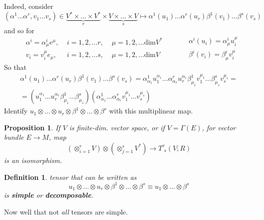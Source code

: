 \documentclass[10pt]{amsart}
\newtheorem{proposition}{Proposition}
\newtheorem{definition}{Definition}
\begin{document}
\begin{multicols*}{2}
Indeed, consider 
\[
(\alpha^1 \dots \alpha^r, v_1 \dots v_s) \in \underbrace{V^* \times \dots \times V^* }_{r} \times \underbrace{ V\times \dots \times V}_{s} \mapsto \alpha^1(u_1) \dots \alpha^r(u_r) \beta^1(v_1) \dots \beta^s(v_s)
\]
and so for 
\[
\begin{aligned}
	& \alpha^i = \alpha^i_{\mu} e^{\mu} , \, & \, i =1,2, \dots r, \, & \, \mu = 1,2, \dots \text{dim}V^* \\ 
	& v_i = v_i^{\mu} e_{\mu} , \, & \, i = 1,2, \dots s, \, & \, \mu = 1, 2, \dots \text{dim}V 
\end{aligned} \qquad \, \begin{aligned}
& \alpha^i(u_i) = \alpha^i_{\mu} u^{\mu}_i \\ 
 & \beta^i(v_i) = \beta^i_{\mu} v^{\mu}_i
\end{aligned}
\]
So that 
\[
\begin{gathered}
	\alpha^1(u_1) \dots \alpha^r(u_r) \beta^1(v_1) \dots \beta^s(v_s) = \alpha^1_{\alpha_1}u^{\alpha_1}_1 \dots \alpha^r_{\alpha_r} u^{\alpha_r}_r \beta^1_{\mu_1} v^{\mu_1}_1 \dots \beta^s_{\mu_s} v^{\mu_s}_s = \\
	= (u^{\alpha_1}_1 \dots u_r^{\alpha_r} \beta^1_{\mu_1} \dots \beta^s_{\mu_s})(\alpha^1_{\alpha_1} \dots \alpha^r_{\alpha_r} v_1^{\mu_1} \dots v_s^{\mu_s} )
\end{gathered}
\]
Identify $u_1 \otimes \dots \otimes u_r \otimes \beta^1 \otimes \dots \otimes \beta^s$ with this multiplinear map.  

\begin{proposition}
If $V$ is finite-dim. vector space, or if $V=\Gamma(E)$, for vector bundle $E\to M$, map
\begin{equation}
\left( \otimes_{i=1}^r V \right)  \otimes \left( \otimes_{j=1}^s V^* \right) \to T^r_{ \, \, s}(V;R)
\end{equation}
is an isomorphism.  
\end{proposition}

\begin{definition}
tensor that can be written as 
\begin{equation}
u_1\otimes \dots \otimes u_r \otimes \beta^1 \otimes \dots \otimes \beta^s \equiv u_1\otimes \dots \otimes \beta^s 
\end{equation}
is \textbf{simple} or \textbf{decomposable}.  
\end{definition}
Now well that not \emph{all} tensors are simple.  


\end{multicols*}
\end{document}
